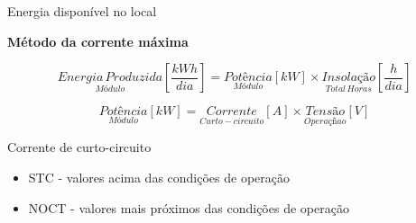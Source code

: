 \begin{frame}{Energia disponível no local}

\textbf{Método da corrente máxima}

\vspace{.5cm}

\begin{footnotesize}
\begin{equation*}
\underset{Módulo}{Energia \, Produzida}\left [ \frac{kWh}{dia} \right ]=\underset{Módulo}{Potência}\left [ kW \right ] \times \underset{Total \, Horas}{Insolação}\left [ \frac{h}{dia} \right ]
\end{equation*}
\end{footnotesize}

\begin{footnotesize}
\begin{equation*}
\underset{Módulo}{Potência}\left [ kW \right ]=\underset{Curto-circuito}{Corrente}\left [ A \right ] \times \underset{Operaçñao}{Tensão}\left [ V \right ]
\end{equation*}
\end{footnotesize}

\begin{exampleblock}{Corrente de curto-circuito}
	\begin{itemize}
		\item STC - valores acima das condições de operação
		\item NOCT - valores mais próximos das condições de operação
	\end{itemize}
\end{exampleblock}

\end{frame}
